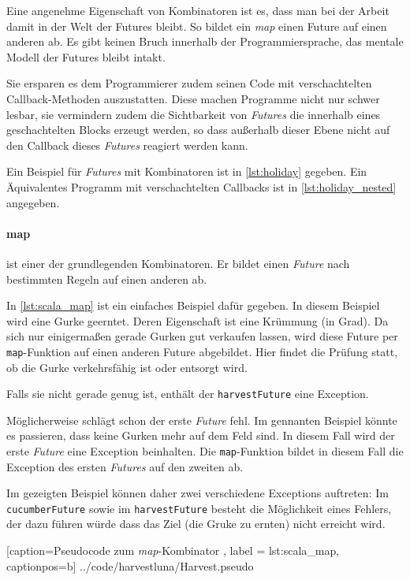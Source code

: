 Eine angenehme Eigenschaft von Kombinatoren ist es, dass man bei
der Arbeit damit in der Welt der Futures bleibt. So bildet
ein \emph{map} einen Future auf einen anderen ab. Es gibt keinen
Bruch innerhalb der Programmiersprache, das mentale Modell der
Futures bleibt intakt.

Sie ersparen es dem Programmierer zudem seinen Code mit verschachtelten
Callback-Methoden auszustatten. Diese machen Programme nicht nur
schwer lesbar, sie vermindern zudem die Sichtbarkeit von \emph{Futures}
die innerhalb eines geschachtelten Blocks erzeugt werden, so dass
außerhalb dieser Ebene nicht auf den Callback dieses \emph{Futures}
reagiert werden kann.

Ein Beispiel für \emph{Futures} mit Kombinatoren ist in \ref{lst:holiday}
gegeben. Ein Äquivalentes Programm mit verschachtelten Callbacks
ist in \ref{lst:holiday_nested} angegeben.

\paragraph{map} ist einer der grundlegenden Kombinatoren. Er bildet
einen \emph{Future} nach bestimmten Regeln auf einen anderen ab.

In \ref{lst:scala_map} ist ein einfaches Beispiel dafür gegeben.
In diesem Beispiel wird eine Gurke geerntet. Deren Eigenschaft ist eine
Krümmung (in Grad). Da sich nur einigermaßen gerade
Gurken gut verkaufen lassen, wird diese Future per \texttt{map}-Funktion
auf einen anderen Future abgebildet. Hier findet die Prüfung statt, ob
die Gurke verkehrsfähig ist oder entsorgt wird.

Falls sie nicht gerade genug ist, enthält der \texttt{harvestFuture}
eine Exception.

Möglicherweise schlägt schon der erste \emph{Future} fehl. Im gennanten
Beispiel könnte es passieren, dass keine Gurken mehr auf dem Feld sind.
In diesem Fall wird der erste \emph{Future} eine Exception beinhalten.
Die \texttt{map}-Funktion bildet in diesem Fall die Exception des
ersten \emph{Futures} auf den zweiten ab.

Im gezeigten Beispiel können daher zwei verschiedene Exceptions auftreten:
Im \texttt{cucumberFuture} sowie im \texttt{harvestFuture} besteht
die Möglichkeit eines Fehlers, der dazu führen würde dass das Ziel
(die Gruke zu ernten) nicht erreicht wird.


    [caption={Pseudocode zum \emph{map}-Kombinator },
       label = lst:scala_map,
       captionpos=b]
 {../code/harvestluna/Harvest.pseudo}
 
